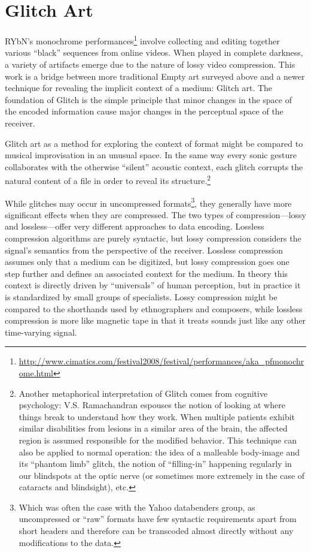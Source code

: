 \documentclass{thesis}
\begin{document}
\section{Glitch Art}

RYbN's monochrome performances\footnote{\url{http://www.cimatics.com/festival2008/festival/performances/aka_pfmonochrome.html}} involve collecting and editing together various ``black'' sequences from online videos. When played in complete darkness, a variety of artifacts emerge due to the nature of lossy video compression. This work is a bridge between more traditional Empty art surveyed above and a newer technique for revealing the implicit context of a medium: Glitch art. The foundation of Glitch is the simple principle that minor changes in the space of the encoded information cause major changes in the perceptual space of the receiver.

Glitch art as a method for exploring the context of format might be compared to musical improvisation in an unusual space. In the same way every sonic gesture collaborates with the otherwise ``silent'' acoustic context, each glitch corrupts the natural content of a file in order to reveal its structure.\footnote{Another metaphorical interpretation of Glitch comes from cognitive psychology: V.S. Ramachandran espouses the notion of looking at where things break to understand how they work\cite{ramachandran_phantoms_1999}. When multiple patients exhibit similar disabilities from lesions in a similar area of the brain, the affected region is assumed responsible for the modified behavior. This technique can also be applied to normal operation: the idea of a malleable body-image and its ``phantom limb'' glitch, the notion of ``filling-in'' happening regularly in our blindspots at the optic nerve (or sometimes more extremely in the case of cataracts and blindsight), etc.}

While glitches may occur in uncompressed formats\footnote{Which was often the case with the Yahoo databenders group\cite{indianropeburn_databenders_????}, as uncompressed or ``raw'' formats have few syntactic requirements apart from short headers and therefore can be transcoded almost directly without any modifications to the data.}, they generally have more significant effects when they are compressed. The two types of compression---lossy and lossless---offer very different approaches to data encoding. Lossless compression algorithms are purely syntactic, but lossy compression considers the signal's semantics from the perspective of the receiver. Lossless compression assumes only that a medium can be digitized, but lossy compression goes one step further and defines an associated context for the medium. In theory this context is directly driven by ``universals'' of human perception, but in practice it is standardized by small groups of specialists. Lossy compression might be compared to the shorthands used by ethnographers and composers, while lossless compression is more like magnetic tape in that it treats sounds just like any other time-varying signal.
\end{document}

